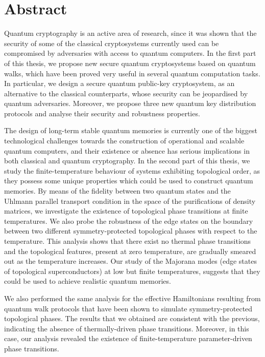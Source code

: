
\chapter*{Abstract}
\noindent Quantum cryptography is an active area of research, since it was shown that the security of some of the classical cryptosystems currently used can be compromised by adversaries with access to quantum computers. In the first part of this thesis, we propose new secure quantum cryptosystems based on quantum walks, which have been proved very useful in several quantum computation tasks. In particular, we design a secure quantum public-key cryptosystem, as an alternative to the classical counterparts, whose security can be jeopardised by quantum adversaries. Moreover, we propose three new quantum key distribution protocols and analyse their security and robustness properties.

The design of long-term stable quantum memories is currently one of the biggest technological challenges towards the construction of operational and scalable quantum computers, and their existence or absence has serious implications in both classical and quantum cryptography. In the second part of this thesis, we study the finite-temperature behaviour of systems exhibiting topological order, as they possess some unique properties which could be used to construct quantum memories. By means of the fidelity between two quantum states and the Uhlmann parallel transport condition in the space of the purifications of density matrices, we investigate the existence of topological phase transitions at finite temperatures. We also probe the robustness of the edge states on the boundary between two different symmetry-protected topological phases with respect to the temperature. This analysis shows that there exist no thermal phase transitions and the topological features, present at zero temperature, are gradually smeared out as the temperature increases. Our study of the Majorana modes (edge states of topological superconductors) at low but finite temperatures, suggests that they could be used to achieve realistic quantum memories.

We also performed the same analysis for the effective Hamiltonians resulting from quantum walk protocols that have been shown to simulate symmetry-protected topological phases. The results that we obtained are consistent with the previous, indicating the absence of thermally-driven phase transitions. Moreover, in this case, our analysis revealed the existence of finite-temperature parameter-driven phase transitions.

